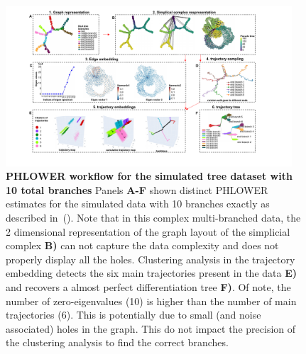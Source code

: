 \begin{figure}[!ht]
  \centering
  \includegraphics[width=0.95\textwidth]{DLA10_PHLOWER/fig}
  \vspace{0.1cm}
  \caption[Workflow for DLA simulated data.]{\textbf{PHLOWER workflow for the simulated tree dataset with 10 total branches} Panels \textbf{A-F} shown distinct PHLOWER estimates for the simulated data with 10 branches exactly as described in~(). Note that in this complex multi-branched data, the 2 dimensional representation of the graph layout of the simplicial complex \textbf{B)} can not capture the data complexity and does not properly display all the holes. Clustering analysis in the trajectory embedding detects the six main trajectories present in the data \textbf{E)} and recovers a almost perfect differentiation tree \textbf{F)}. Of note, the number of zero-eigenvalues (10) is higher than the number of main trajectories (6).  This is potentially due to small (and noise associated) holes in the graph. This do not impact the precision of the clustering analysis to find the correct branches.}
  \label{supfig:dla10-workflow}
\end{figure}

